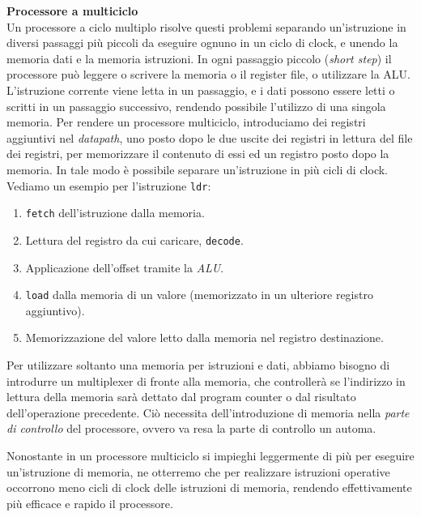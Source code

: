\begin{defn}
    \textbf{Processore a multiciclo} \\
    Un processore a ciclo multiplo risolve questi problemi separando un'istruzione
    in diversi passaggi più piccoli da eseguire ognuno in un ciclo di clock, e unendo la memoria dati e la memoria istruzioni.
    In ogni passaggio piccolo (\textit{short step})
    il processore può leggere o scrivere la memoria o il register file, o utilizzare la ALU. \@
    L'istruzione corrente viene letta in un passaggio, e i dati possono essere letti o scritti in un passaggio successivo,
    rendendo possibile l'utilizzo di una singola memoria. Per rendere un processore multiciclo, introduciamo dei registri aggiuntivi
    nel \textit{datapath}, uno posto dopo le due uscite dei registri in lettura del file dei registri, per memorizzare
    il contenuto di essi ed un registro posto dopo la memoria. In tale modo è possibile separare un'istruzione in più cicli di clock.
    Vediamo un esempio per l'istruzione \texttt{ldr}:

    \begin{enumerate}
        \item \texttt{fetch} dell'istruzione dalla memoria.
        \item Lettura del registro da cui caricare, \texttt{decode}.
        \item Applicazione dell'offset tramite la \textit{ALU}.
        \item \texttt{load} dalla memoria di un valore (memorizzato in un ulteriore registro aggiuntivo).
        \item Memorizzazione del valore letto dalla memoria nel registro destinazione.
    \end{enumerate}

    Per utilizzare soltanto una memoria per istruzioni e dati, abbiamo bisogno di introdurre un multiplexer di fronte alla memoria,
    che controllerà se l'indirizzo in lettura della memoria sarà dettato dal program counter o dal risultato dell'operazione precedente.
    Ciò necessita dell'introduzione di memoria nella \textit{parte di controllo} del processore, ovvero va resa la parte di controllo un automa.

    Nonostante in un processore multiciclo si impieghi leggermente di più per eseguire un'istruzione di memoria,
    ne otterremo che per realizzare istruzioni operative occorrono meno cicli di clock delle istruzioni di memoria,
    rendendo effettivamente più efficace e rapido il processore.
\end{defn}

